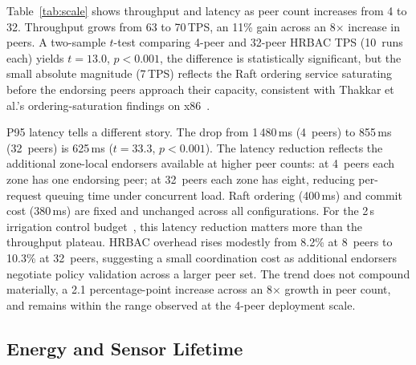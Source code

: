 \documentclass[a4paper,fleqn]{cas-dc}
\begin{document}
Table~\ref{tab:scale} shows throughput and latency as peer count
increases from 4 to 32. Throughput grows from 63 to 70\,TPS, an 11\%
gain across an 8$\times$ increase in peers. A two-sample $t$-test
comparing 4-peer and 32-peer HRBAC TPS (10~runs each) yields
$t{=}13.0$, $p{<}0.001$, the difference is statistically significant,
but the small absolute magnitude (7\,TPS) reflects the Raft ordering
service saturating before the endorsing peers approach their capacity,
consistent with Thakkar et al.'s ordering-saturation findings on
x86~\cite{thakkar2018performance}.

P95 latency tells a different story. The drop from 1\,480\,ms (4~peers)
to 855\,ms (32~peers) is 625\,ms ($t{=}33.3$, $p{<}0.001$). The latency
reduction reflects the additional zone-local endorsers available at
higher peer counts: at 4~peers each zone has one endorsing peer; at
32~peers each zone has eight, reducing per-request queuing time under
concurrent load. Raft ordering (400\,ms) and commit cost (380\,ms) are
fixed and unchanged across all configurations.
For the 2\,s irrigation control budget~\cite{leacox2013wireless}, this
latency reduction matters more than the throughput plateau. HRBAC
overhead rises modestly from 8.2\% at 8~peers to 10.3\% at 32~peers,
suggesting a small coordination cost as additional endorsers negotiate
policy validation across a larger peer set. The trend does not compound
materially, a 2.1 percentage-point increase across an 8$\times$ growth
in peer count, and remains within the range observed at the 4-peer
deployment scale.

\begin{table}[pos=t]
\caption{Scalability: throughput and latency across 4--32 peers
  ($n{=}10$ runs; overhead = RBAC TPS reduction vs.\ no-RBAC
  baseline).}
\label{tab:scale}
\end{table}

\subsection{Energy and Sensor Lifetime}
\label{subsec:energy}
\end{document}
